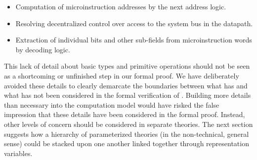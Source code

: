 \begin{itemize}
\item
Computation of microinstruction addresses by the next address logic.
\item
Resolving decentralized control over
access to the system bus in the datapath.
\item
Extraction of individual bits and other sub-fields from
microinstruction words by decoding logic.
\end{itemize}

This lack of detail about basic types and primitive operations
should not be seen as a shortcoming or unfinished step in
our formal proof.
We have deliberately avoided these details to clearly demarcate
the boundaries between what has and what has not been considered
in the formal verification of \Tamarack.
Building more details than necessary into the
computation model
would have risked the
false impression that these details have been
considered in the formal proof.
Instead, other levels of concern should be considered
in separate theories.
The next section suggests how a hierarchy of
parameterized theories
(in the non-technical, general sense)
could be stacked upon one another linked together through
representation variables.
